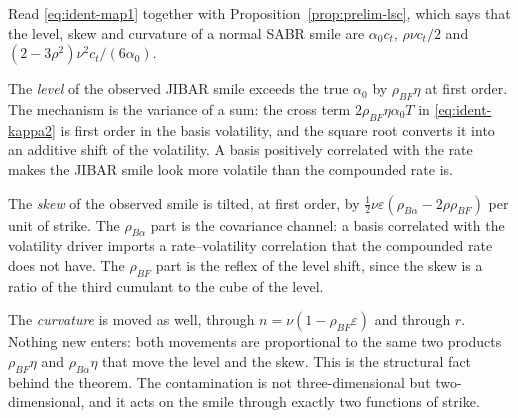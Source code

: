 \documentclass[../../../main.tex]{subfiles}
\begin{document}
\begin{remark}\label{rem:ident-reading}
Read \eqref{eq:ident-map1} together with Proposition~\ref{prop:prelim-lsc}, which says that the level, skew and curvature of a normal SABR smile are $\alpha_0c_t$, $\rho\nu c_t/2$ and $(2-3\rho^2)\nu^2c_t/(6\alpha_0)$.

The \emph{level} of the observed JIBAR smile exceeds the true $\alpha_0$ by $\rho_{BF}\eta$ at first order. The mechanism is the variance of a sum: the cross term $2\rho_{BF}\eta\alpha_0T$ in \eqref{eq:ident-kappa2} is first order in the basis volatility, and the square root converts it into an additive shift of the volatility. A basis positively correlated with the rate makes the JIBAR smile look more volatile than the compounded rate is.

The \emph{skew} of the observed smile is tilted, at first order, by $\tfrac12\nu\varepsilon(\rho_{B\alpha}-2\rho\rho_{BF})$ per unit of strike. The $\rho_{B\alpha}$ part is the covariance channel: a basis correlated with the volatility driver imports a rate--volatility correlation that the compounded rate does not have. The $\rho_{BF}$ part is the reflex of the level shift, since the skew is a ratio of the third cumulant to the cube of the level.

The \emph{curvature} is moved as well, through $n=\nu(1-\rho_{BF}\varepsilon)$ and through $r$. Nothing new enters: both movements are proportional to the same two products $\rho_{BF}\eta$ and $\rho_{B\alpha}\eta$ that move the level and the skew. This is the structural fact behind the theorem. The contamination is not three-dimensional but two-dimensional, and it acts on the smile through exactly two functions of strike.
\end{remark}
\end{document}
